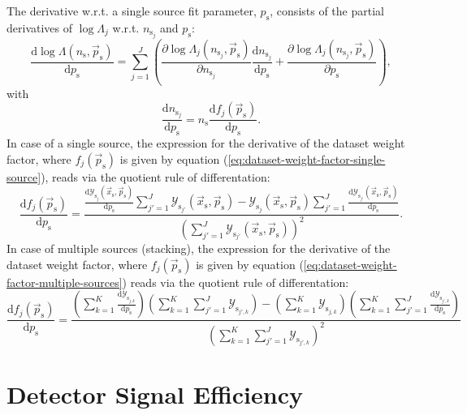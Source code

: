 \documentclass{article}
\newcommand{\ns}{n_{\mathrm{s}}}
\newcommand{\nsj}{n_{\mathrm{s}_j}}
\newcommand{\ps}{\vec{p}_{\mathrm{s}}}
\newcommand{\xs}{\vec{x}_{\mathrm{s}}}
\begin{document}
The derivative w.r.t. a single source fit parameter, $p_{\mathrm{s}}$, consists
of the partial derivatives of $\log \Lambda_j$ w.r.t. $n_{\mathrm{s}_j}$ and
$p_{\mathrm{s}}$:
\begin{equation}
 \frac{\mathrm{d} \log \Lambda(\ns,\ps)}{\mathrm{d} p_{\mathrm{s}}} = \sum_{j=1}^{J} \left( \frac{\partial \log \Lambda_j(\nsj,\ps)}{\partial \nsj} \frac{\mathrm{d} \nsj}{\mathrm{d} p_{\mathrm{s}}} + \frac{\partial \log \Lambda_j(\nsj,\ps)}{\partial p_{\mathrm{s}}} \right),
\end{equation}
with
\begin{equation}
 \frac{\mathrm{d} \nsj}{\mathrm{d} p_{\mathrm{s}}} = \ns \frac{\mathrm{d} f_j(\ps)}{\mathrm{d} p_{\mathrm{s}}}.
\end{equation}
In case of a single source, the expression for the derivative of the dataset
weight factor, where $f_j(\ps)$ is given by equation (\ref{eq:dataset-weight-factor-single-source}),
reads via the quotient rule of differentation:
\begin{equation}
\frac{\mathrm{d}f_j(\ps)}{\mathrm{d}p_{\mathrm{s}}} = \frac{\frac{\mathrm{d}\mathcal{Y}_{\mathrm{s}_j}(\xs,\ps)}{\mathrm{d}p_{\mathrm{s}}} \sum_{j'=1}^{J}\mathcal{Y}_{\mathrm{s}_{j'}}(\xs,\ps) - \mathcal{Y}_{\mathrm{s}_j}(\xs,\ps) \sum_{j'=1}^{J} \frac{\mathrm{d}\mathcal{Y}_{\mathrm{s}_{j'}}(\xs,\ps)}{\mathrm{d}p_{\mathrm{s}}} }{\left( \sum_{j'=1}^{J} \mathcal{Y}_{\mathrm{s}_{j'}}(\xs,\ps) \right)^2}.
\end{equation}
In case of multiple sources (stacking), the expression for the derivative of the
dataset weight factor, where $f_j(\ps)$ is given by equation
(\ref{eq:dataset-weight-factor-multiple-sources}) reads via the quotient rule of
differentation:
\begin{equation}
 \frac{\mathrm{d} f_j(\ps)}{\mathrm{d}p_{\mathrm{s}}} =
    \frac{\left(\sum_{k=1}^{K} \frac{\mathrm{d}\mathcal{Y}_{\mathrm{s}_{j,k}}}{\mathrm{d}p_{\mathrm{s}}}\right) \left(\sum_{k=1}^{K}\sum_{j'=1}^{J}\mathcal{Y}_{\mathrm{s}_{j',k}}\right) - \left(\sum_{k=1}^{K}\mathcal{Y}_{\mathrm{s}_{j,k}}\right)\left(\sum_{k=1}^{K}\sum_{j'=1}^{J}\frac{\mathrm{d}\mathcal{Y}_{\mathrm{s}_{j',k}}}{\mathrm{d}p_{\mathrm{s}}}\right)}
         {\left(\sum_{k=1}^{K}\sum_{j'=1}^{J}\mathcal{Y}_{\mathrm{s}_{j',k}} \right)^2}
\end{equation}

\section{Detector Signal Efficiency}
\label{sec:detsigeff}
\end{document}
